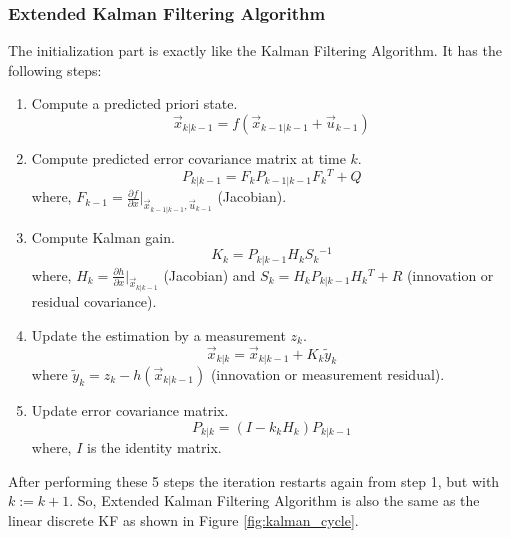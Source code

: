 \subsubsection{Extended Kalman Filtering Algorithm}
The initialization part is exactly like the Kalman Filtering Algorithm. It has the following steps\cite{aich2010study}:
\begin{enumerate}
  \item  Compute a predicted priori state.
  $$\vec{x}_{k|k-1} = f( \vec{x}_{k-1|k-1} + \vec{u}_{k-1})$$
  \item Compute predicted error covariance matrix at time $k$.
  $$P_{k|k-1} = F_{k}P_{k-1|k-1} F{_{k}}^T + Q$$
  where, $F_{k-1} = \frac{\partial f}{\partial x} |_{\vec{x}_{k-1|k-1},\vec{u}_{k-1}}$ (Jacobian).
  \item Compute Kalman gain.
  $$K_{k} = P_{k|k-1}H_{k}S{_{k}}^{-1}$$
  where, $H_{k} = \frac{\partial h}{\partial x} |_{\vec{x}_{k|k-1}}$ (Jacobian) and $S_{k} = H_{k}P_{k|k-1}H{_{k}}^T + R$ (innovation or residual covariance).
  \item Update the estimation by a measurement $z_{k}$.
  $$\vec{x}_{k|k} = \vec{x}_{k|k-1} + K_{k}\tilde y_{k}$$
  where $\tilde y_{k}=z_{k}-h(\vec{x}_{k|k-1})$ (innovation or measurement residual).
  \item Update error covariance matrix.
  $$P_{k|k} = (I - k_{k}H_{k})P_{k|k-1}$$
  where, $I$ is the identity matrix.
\end{enumerate}
After performing these 5 steps the iteration restarts again from step 1, but with $k:=k+1$.
So, Extended Kalman Filtering Algorithm is also the same as the linear discrete KF as shown in Figure \ref{fig:kalman_cycle}\cite{bishop2001introduction}.